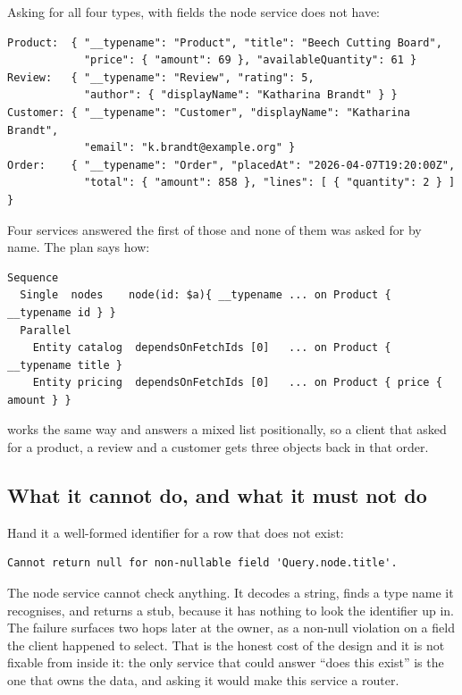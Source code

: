Asking for all four types, with fields the node service does not have:

\begin{verbatim}
Product:  { "__typename": "Product", "title": "Beech Cutting Board",
            "price": { "amount": 69 }, "availableQuantity": 61 }
Review:   { "__typename": "Review", "rating": 5,
            "author": { "displayName": "Katharina Brandt" } }
Customer: { "__typename": "Customer", "displayName": "Katharina Brandt",
            "email": "k.brandt@example.org" }
Order:    { "__typename": "Order", "placedAt": "2026-04-07T19:20:00Z",
            "total": { "amount": 858 }, "lines": [ { "quantity": 2 } ] }
\end{verbatim}

Four services answered the first of those and none of them was asked for by
name. The plan says how:

\begin{verbatim}
Sequence
  Single  nodes    node(id: $a){ __typename ... on Product { __typename id } }
  Parallel
    Entity catalog  dependsOnFetchIds [0]   ... on Product { __typename title }
    Entity pricing  dependsOnFetchIds [0]   ... on Product { price { amount } }
\end{verbatim}

 works the same way and answers a mixed list positionally, so a
client that asked for a product, a review and a customer gets three objects back
in that order.

\subsection*{What it cannot do, and what it must not do}

%
Hand it a well-formed identifier for a row that does not exist:

\begin{verbatim}
Cannot return null for non-nullable field 'Query.node.title'.
\end{verbatim}

The node service cannot check anything. It decodes a string, finds a type name it
recognises, and returns a stub, because it has nothing to look the identifier up
in. The failure surfaces two hops later at the owner, as a non-null violation on
a field the client happened to select. That is the honest cost of the design and
it is not fixable from inside it: the only service that could answer
\enquote{does this exist} is the one that owns the data, and asking it would make
this service a router.

